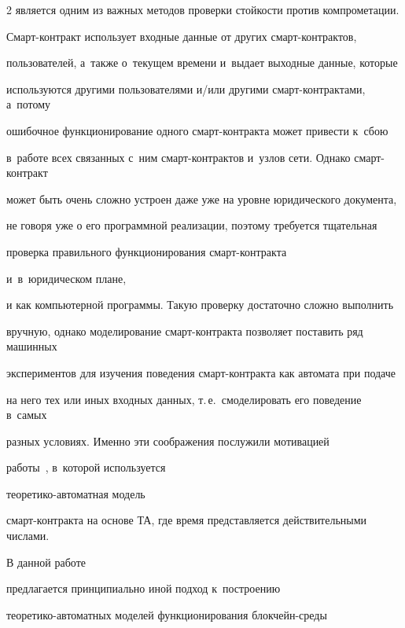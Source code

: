 \begin{multicols}{2}
является одним из важных методов проверки стойкости  против компрометации. 


Смарт-кон\-тракт использует входные данные от других смарт-кон\-трак\-тов,


пользователей, а~также о~текущем времени и~выдает  выходные данные, которые


используются другими пользователями и/или другими смарт-кон\-трак\-та\-ми, а~потому


ошибочное функционирование одного смарт-кон\-трак\-та может привести к~сбою 


в~работе всех связанных с~ним смарт-кон\-трак\-тов и~узлов сети. Однако смарт-кон\-тракт


может быть очень сложно устроен даже уже на уровне юридического документа,


не говоря уже о его программной реализации, поэтому требуется тщательная


проверка правильного функционирования смарт-кон\-трак\-та\linebreak


 и~в~юридическом плане,


и как компьютерной программы. Такую проверку достаточно сложно выполнить


вручную, однако моделирование смарт-кон\-трак\-та позволяет поставить ряд машинных\linebreak


экспериментов для изучения поведения смарт-кон\-трак\-та как автомата при подаче


на него тех или иных входных данных, т.\,е.\ смоделировать его поведение в~самых


разных условиях. Именно эти соображения послужили мотивацией


 работы~\cite{Bitcoin-contract-model}, в~которой используется 


 тео\-ре\-ти\-ко-ав\-то\-мат\-ная модель


смарт-кон\-трак\-та на основе ТА, где время представляется действительными чис\-лами.











 В данной работе


предлагается принципиально иной подход к~построению 


тео\-ре\-ти\-ко-ав\-то\-мат\-ных моделей  функционирования блок\-чейн-сре\-ды 



\end{multicols}
